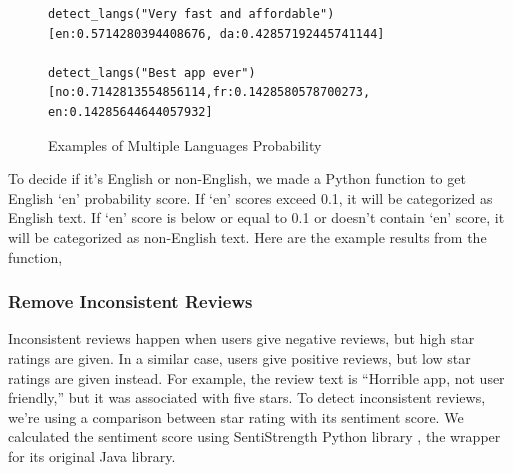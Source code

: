 \documentclass[12pt]{article}
\begin{document}
\begin{figure}
\begin{lstlisting}
detect_langs("Very fast and affordable")
[en:0.5714280394408676, da:0.42857192445741144]

detect_langs("Best app ever")
[no:0.7142813554856114,fr:0.1428580578700273, en:0.14285644644057932]

\end{lstlisting}
\caption{Examples of Multiple Languages Probability}
\label{fig:langdetect_2}
\end{figure}






To decide if it’s English or non-English, we made a Python function to get English ‘en’ probability score. If ‘en’ scores exceed 0.1, it will be categorized as English text. If ‘en’ score is below or equal to 0.1 or doesn’t contain ‘en’ score, it will be categorized as non-English text. Here are the example results from the function,



\subsubsection{Remove Inconsistent Reviews}
Inconsistent reviews happen when users give negative reviews, but high star ratings are given. In a similar case, users give positive reviews, but low star ratings are given instead. For example, the review text is “Horrible app, not user friendly,” but it was associated with five stars. To detect inconsistent reviews, we’re using a comparison between star rating with its sentiment score. We calculated the sentiment score using SentiStrength Python library \cite{sentistrength}, the wrapper for its original Java library.
\end{document}
